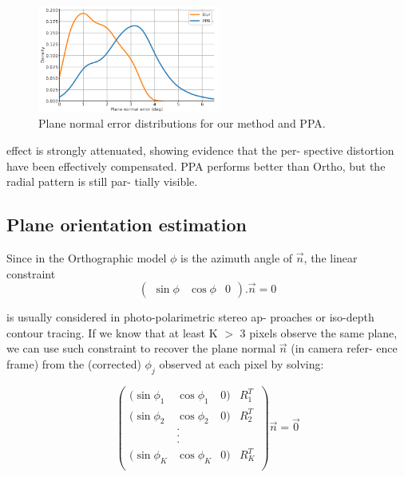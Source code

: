 \documentclass[letterpaper, 6 pt, journal, twoside]{IEEEtran}
\begin{document}
\begin{figure}
    \centering
    \includegraphics[width=6cm]{images/Figure_3.png} 
    \caption{Plane normal error distributions for our method and PPA.}
    \label{fig:Fig3}
\end{figure}

effect is strongly attenuated, showing evidence that the per-
spective distortion have been effectively compensated. PPA
performs better than Ortho, but the radial pattern is still par-
tially visible.

\subsection{Plane orientation estimation}

    Since in the Orthographic model $\phi$ is the azimuth angle of $\Vec{n}$, the linear constraint 
\begin{equation}
        (\begin{array}{ccc} \sin{\phi} & \cos{\phi} & 0 \end{array}) . \Vec{n} = 0
\end{equation}

is usually considered in photo-polarimetric stereo ap-
proaches or iso-depth contour tracing. If we know that at
least K $>$ 3 pixels observe the same plane, we can use such
constraint to recover the plane normal $\Vec{n}$ (in camera refer-
ence frame) from the (corrected) $\phi_j$ observed at each pixel
by solving:

\begin{equation}
        (\begin{array}{cccc} 
        (\sin{\phi_1} & \cos{\phi_1} & 0 ) & R_1^T \\
        (\sin{\phi_2} & \cos{\phi_2} & 0 ) & R_2^T \\
        & . \\
        & . \\
        & . \\
        (\sin{\phi_K} & \cos{\phi_K} & 0 ) & R_K^T \\
        \end{array})  
        \Vec{n} = \Vec{0}
\end{equation}
\end{document}
